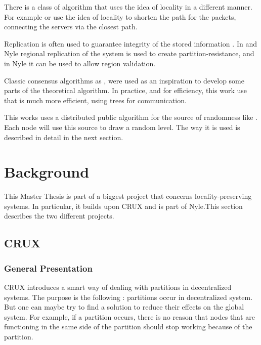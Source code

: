 \documentclass[a4paper,11pt,oneside]{report}
\begin{document}
There is a class of algorithm that uses the idea of locality in a different
manner. For example \cite{Geo-DNS} or \cite{IP Anycast} use the idea of
locality to shorten the path for the packets, connecting the servers via the
closest path.

Replication is often used to guarantee integrity of the stored information
\cite{find-paper-replication}. In \cite{CRUX} and Nyle regional replication of
the system is used to create partition-resistance, and in Nyle it can be used
to allow region validation.

Classic consensus algorithms as \cite{Paxos}, \cite{PBFT} were used as an
inspiration to develop some parts of the theoretical algorithm. In practice,
and for efficiency, this work use \cite{BlsCoSi} that is much more efficient,
using trees for communication.  

This works uses a distributed public algorithm for the source of randomness
like \cite{RandHound}. Each node will use this source to draw a random level.
The way it is used is described in detail in the next section. 


\chapter{Background}


This Master Thesis is part of a biggest project that concerns
locality-preserving systems. In particular, it builds upon
CRUX\cite{basescu2014crux} and is part of Nyle.This section describes the two
different projects. 

\section{CRUX}

\subsection{General Presentation} CRUX introduces a smart way of dealing with
partitions in decentralized systems. The purpose is the following : partitions
occur in decentralized system. But one can maybe try to find a solution to
reduce their effects on the global system. For example, if a partition occurs,
there is no reason that nodes that are functioning in the same side of the
partition should stop working because of the partition. 
\end{document}
